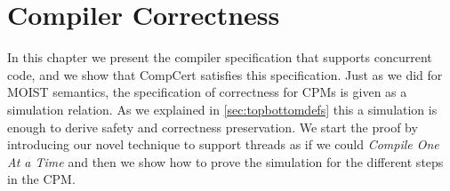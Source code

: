 \chapter{Compiler Correctness}\label{ch:compiler}

In this chapter we present the compiler specification that supports concurrent code, and we show that CompCert satisfies this specification. Just as we did for MOIST semantics, the specification of correctness for CPMs is given as a simulation relation. As we explained in \cref{sec:topbottomdefs} this a simulation is enough to derive safety and correctness preservation. We start the proof by introducing our novel technique to support threads as if we could  \emph{Compile One At a Time} and then we show how to prove the simulation for the different steps in the CPM.









